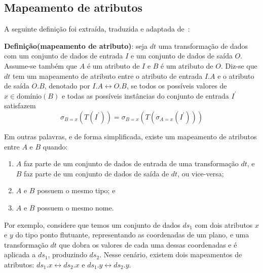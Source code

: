 \subsection{Mapeamento de atributos}

A seguinte definição foi extraída, traduzida e adaptada de~\cite{ikeda2013logical}:

\textbf{Definição(mapeamento de atributo)}: seja \( dt \) uma transformação de dados com um conjunto de dados de entrada \( I \) e um conjunto de dados de saída \( O \). Assume-se também que \( A \) é um atributo de \( I \) e \( B \) é um atributo de \( O \). Diz-se que \( dt \) tem um mapeamento de atributo entre o atributo de entrada \( I.A \) e o atributo de saída \( O.B \), denotado por \( I.A \leftrightarrow O.B \), se todos os possíveis valores de \( x \in \textrm{domínio}(B) \) e todas as possíveis instâncias do conjunto de entrada \( I^{\prime} \) satisfazem
\[ \sigma_{B=x}(T(I^{\prime})) = \sigma_{B=x}(T(\sigma_{A=x}(I^{\prime}))) \]

Em outras palavras, e de forma simplificada, existe um mapeamento de atributos entre \( A \) e \( B \) quando:

\begin{enumerate}
    \item \( A \) faz parte de um conjunto de dados de entrada de uma transformação \( dt \), e \( B \) faz parte de um conjunto de dados de saída de \( dt \), ou vice-versa;
    \item \( A \) e \( B \) possuem o mesmo tipo; e
    \item \( A \) e \( B \) possuem o mesmo nome.
\end{enumerate}

Por exemplo, considere que temos um conjunto de dados \( ds_{1} \) com dois atributos \( x \) e \( y \) do tipo ponto flutuante, representando as coordenadas de um plano, e uma transformação \( dt \) que dobra os valores de cada uma dessas coordenadas e é aplicada a \( ds_{1} \), produzindo \( ds_{2} \). Nesse cenário, existem dois mapeamentos de atributos: \( ds_{1}.x \leftrightarrow ds_{2}.x \) e \( ds_{1}.y \leftrightarrow ds_{2}.y \).
